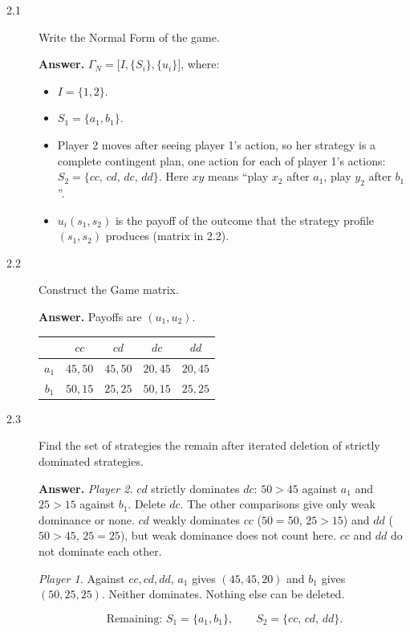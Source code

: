 \documentclass[11pt]{article}
\newenvironment{solution}{\par\smallskip\noindent\textbf{Answer.} }{\par\medskip}
\begin{document}
\begin{description}
\item[2.1] Write the Normal Form of the game.
\begin{solution}
$\Gamma_N=\big[I,\{S_i\},\{u_i\}\big]$, where:
\begin{itemize}[itemsep=0pt]
\item $I=\{1,2\}$.
\item $S_1=\{a_1,b_1\}$.
\item Player 2 moves after seeing player 1's action, so her strategy is a complete contingent plan, one action for each of player 1's actions: $S_2=\{cc,\,cd,\,dc,\,dd\}$. Here $xy$ means ``play $x_2$ after $a_1$, play $y_2$ after $b_1$''.
\item $u_i(s_1,s_2)$ is the payoff of the outcome that the strategy profile $(s_1,s_2)$ produces (matrix in 2.2).
\end{itemize}
\end{solution}

\item[2.2] Construct the Game matrix.
\begin{solution}
Payoffs are $(u_1,u_2)$.
\begin{center}
\begin{tabular}{c|cccc}
 & $cc$ & $cd$ & $dc$ & $dd$\\ \hline
$a_1$ & $45,50$ & $45,50$ & $20,45$ & $20,45$\\
$b_1$ & $50,15$ & $25,25$ & $50,15$ & $25,25$
\end{tabular}
\end{center}
\end{solution}

\item[2.3] Find the set of strategies the remain after iterated deletion of strictly dominated strategies.
\begin{solution}
\emph{Player 2.} $cd$ strictly dominates $dc$: $50>45$ against $a_1$ and $25>15$ against $b_1$. Delete $dc$. The other comparisons give only weak dominance or none. $cd$ weakly dominates $cc$ ($50=50$, $25>15$) and $dd$ ($50>45$, $25=25$), but weak dominance does not count here. $cc$ and $dd$ do not dominate each other.

\emph{Player 1.} Against $cc,cd,dd$, $a_1$ gives $(45,45,20)$ and $b_1$ gives $(50,25,25)$. Neither dominates. Nothing else can be deleted.

\[
\text{Remaining: } S_1=\{a_1,b_1\},\qquad S_2=\{cc,\,cd,\,dd\}.
\]
\end{solution}


\end{description}
\end{document}
